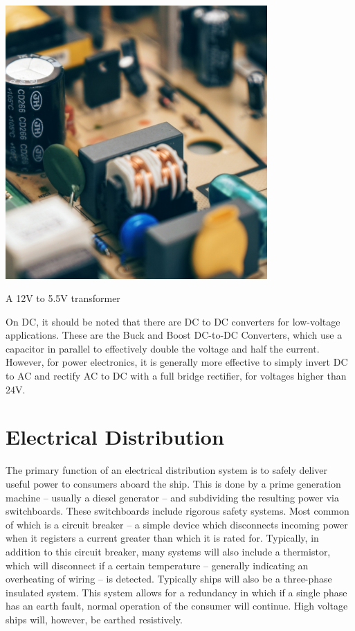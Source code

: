 \documentclass[11pt,a4paper]{article}
\begin{document}
\begin{center}
\includegraphics[width=10cm]{transformertiny.jpg}\par
A 12V to 5.5V transformer
\end{center}

On DC, it should be noted that there are DC to DC converters for low-voltage applications. These are the Buck and Boost DC-to-DC Converters, which use a capacitor in parallel to effectively double the voltage and half the current. However, for power electronics, it is generally more effective to simply invert DC to AC and rectify AC to DC with a full bridge rectifier, for voltages higher than 24V.

\section{Electrical Distribution}
The primary function of an electrical distribution system is to safely deliver useful power to consumers aboard the ship. This is done by a prime generation machine -- usually a diesel generator -- and subdividing the resulting power via switchboards. These switchboards include rigorous safety systems. Most common of which is a circuit breaker -- a simple device which disconnects incoming power when it registers a current greater than which it is rated for. Typically, in addition to this circuit breaker, many systems will also include a thermistor, which will disconnect if a certain temperature -- generally indicating an overheating of wiring -- is detected. Typically ships will also be a three-phase insulated system. This system allows for a redundancy in which if a single phase has an earth fault, normal operation of the consumer will continue. High voltage ships will, however, be earthed resistively.
\end{document}
